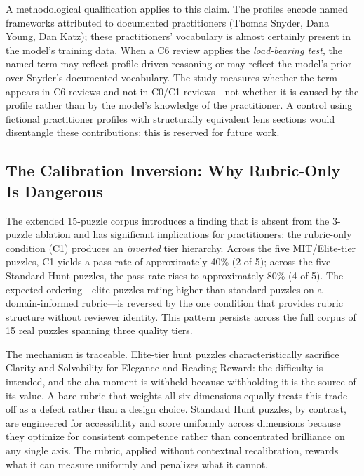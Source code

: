 A methodological qualification applies to this claim. The profiles encode named frameworks
attributed to documented practitioners (Thomas Snyder, Dana Young, Dan Katz); these
practitioners' vocabulary is almost certainly present in the model's training data. When a
C6 review applies the \emph{load-bearing test}, the named term may reflect profile-driven
reasoning or may reflect the model's prior over Snyder's documented vocabulary. The study
measures whether the term appears in C6 reviews and not in C0/C1 reviews---not whether it
is caused by the profile rather than by the model's knowledge of the practitioner. A control
using fictional practitioner profiles with structurally equivalent lens sections would
disentangle these contributions; this is reserved for future work.

\subsection{The Calibration Inversion: Why Rubric-Only Is Dangerous}
\label{sec:calibration-inversion}

The extended 15-puzzle corpus introduces a finding that is absent from the 3-puzzle ablation
and has significant implications for practitioners: the rubric-only condition (C1) produces
an \emph{inverted} tier hierarchy. Across the five MIT/Elite-tier puzzles, C1 yields a pass
rate of approximately 40\% (2 of 5); across the five Standard Hunt puzzles, the pass rate rises to
approximately 80\% (4 of 5). The expected ordering---elite puzzles rating higher than standard puzzles
on a domain-informed rubric---is reversed by the one condition that provides rubric structure
without reviewer identity. This pattern persists across the full corpus of 15 real puzzles
spanning three quality tiers.

The mechanism is traceable. Elite-tier hunt puzzles characteristically sacrifice Clarity and
Solvability for Elegance and Reading Reward: the difficulty is intended, and the aha moment
is withheld because withholding it is the source of its value. A bare rubric that weights all
six dimensions equally treats this trade-off as a defect rather than a design choice. Standard
Hunt puzzles, by contrast, are engineered for accessibility and score uniformly across
dimensions because they optimize for consistent competence rather than concentrated brilliance
on any single axis. The rubric, applied without contextual recalibration, rewards what it can
measure uniformly and penalizes what it cannot.

